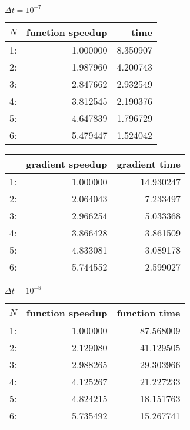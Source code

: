 \begin{center}
$\Delta t=10^{-7}$\\
\begin{tabular}{lrr}
\toprule
{}$N$ &  function speedup &      time \\
\midrule
1:  &  1.000000 &  8.350907 \\
2: &  1.987960 &  4.200743 \\
3: &  2.847662 &  2.932549 \\
4: &  3.812545 &  2.190376 \\
5: &  4.647839 &  1.796729 \\
6: &  5.479447 &  1.524042 \\
\bottomrule
\end{tabular}
\begin{tabular}{lrr}
\toprule
{} &  gradient speedup &     gradient  time \\
\midrule
1:  &  1.000000 &  14.930247 \\
2: &  2.064043 &   7.233497 \\
3: &  2.966254 &   5.033368 \\
4: &  3.866428 &   3.861509 \\
5: &  4.833081 &   3.089178 \\
6: &  5.744552 &   2.599027 \\
\bottomrule
\end{tabular}
\end{center}
\begin{center}
$\Delta t=10^{-8}$\\
\begin{tabular}{lrr}
\toprule
{} $N$&  function speedup &      function time \\
\midrule
1:  &  1.000000 &  87.568009 \\
2: &  2.129080 &  41.129505 \\
3: &  2.988265 &  29.303966 \\
4: &  4.125267 &  21.227233 \\
5: &  4.824215 &  18.151763 \\
6: &  5.735492 &  15.267741 \\
\bottomrule
\end{tabular}
\end{center}
